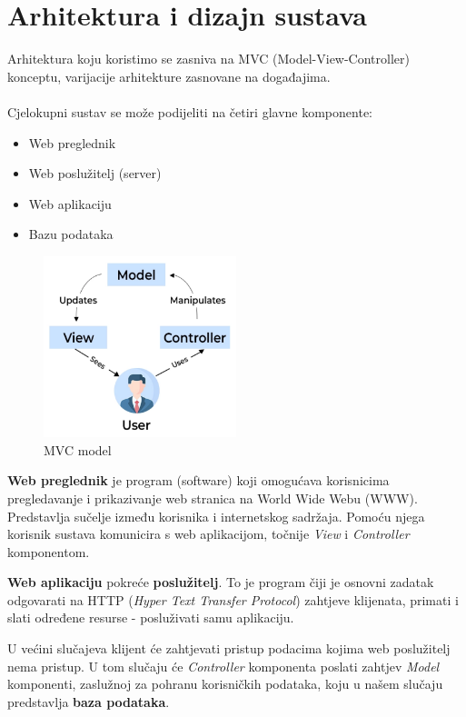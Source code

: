\chapter{Arhitektura i dizajn sustava}

Arhitektura koju koristimo se zasniva na MVC (Model-View-Controller) konceptu, varijacije arhitekture zasnovane na događajima.
\\
\\
Cjelokupni sustav se može podijeliti na četiri glavne komponente:
\begin{itemize}
	\item Web preglednik
	\item Web poslužitelj (server)
	\item Web aplikaciju
	\item Bazu podataka
\end{itemize}

\begin{figure}[h]
	\centering
	\includegraphics[width=0.5\textwidth]{slike/mvc.png}
	\caption{MVC model}
	\label{fig:mesh1}
\end{figure}

\textbf{Web preglednik} je program (software) koji omogućava korisnicima pregledavanje i prikazivanje web stranica na World Wide Webu (WWW). Predstavlja sučelje između korisnika i internetskog sadržaja. Pomoću njega korisnik sustava komunicira s web aplikacijom, točnije \textit{View} i \textit{Controller} komponentom.

\pagebreak

\textbf{Web aplikaciju} pokreće \textbf{poslužitelj}. To je program čiji je osnovni zadatak odgovarati na HTTP (\textit{Hyper Text Transfer Protocol}) zahtjeve klijenata, primati i slati određene resurse - posluživati samu aplikaciju.

\begingroup
U većini slučajeva klijent će zahtjevati pristup podacima kojima web poslužitelj nema pristup. U tom slučaju će \textit{Controller} komponenta poslati zahtjev \textit{Model} komponenti, zaslužnoj za pohranu korisničkih podataka, koju u našem slučaju predstavlja \textbf{baza podataka}.
\endgroup

